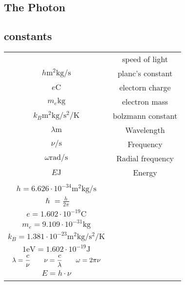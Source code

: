 \documentclass{article}
\begin{document}
\begin{twocolumn} 



\section{The Photon}  

\begin{donotbrake}
\subsection{constants}
\begin{tabular}{cc}
	\begin{dtabular}
		
		$c \si{\metre \per \second}$ & speed of light \\
		$h \si{\metre \squared \kilogram \per \second}$ & planc's constant \\
		$e \si{\coulomb}$ & electorn charge \\
		$m_e \si{\kilogram}$ & electron mass \\
		$k_B \si{\metre \squared \kilogram \per \second \squared \per \kelvin}$ & bolzmann constant \\
		$\lambda \si{\metre}$ & Wavelength \\
		$\nu \si{\per \second}$ & Frequency \\
		$\omega \si{\radian \per \second}$ & Radial frequency \\
		$E \si{\joule}$ & Energy \\
		
	\end{dtabular}

	\begin{mtabular}{c}
		$c = 2.998 \cdot 10^8 \si{\metre \per \second}$ \\
		$h = 6.626 \cdot 10^{-34} \si{\metre \squared \kilogram \per \second}$ \\
		$\hslash = \frac{h}{2\pi}$ \\
		$e = 1.602 \cdot 10^{-19} \si{\coulomb}$ \\
		$m_e = 9.109 \cdot 10^{-31} \si{\kilogram}$ \\
		$k_B = 1.381 \cdot 10^{-23} \si{\metre \squared \kilogram \per \second \squared \per \kelvin}$ \\
		$1 \si{\electronvolt} = 1.602 \cdot 10^{-19} \si{\joule}$ \\
		$\displaystyle \lambda = \frac{c}{\nu} \qquad \displaystyle \nu = \frac{c}{\lambda} \qquad \omega = 2 \pi \nu$ \\
		$E = h \cdot \nu$ \\
	\end{mtabular}
\end{tabular}
\end{donotbrake}


\end{twocolumn}
\end{document}
